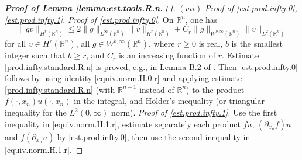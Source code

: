 \documentclass[10pt,reqno,a4paper]{article}
\numberwithin{equation}{section}
\theoremstyle{plain}
\theoremstyle{definition}
\newcommand{\R}{{\mathbb R}}
\newcommand{\pa}{\partial}
\begin{document}
\begin{proof}[\textbf{Proof of Lemma \ref{lemma:est.tools.R.n.+}}]
\medskip

$(vii)$ \emph{Proof of \eqref{est.prod.infty.0}, \eqref{est.prod.infty.1}}.
\emph{Proof of \eqref{est.prod.infty.0}}. On $\R^n$, one has 
\begin{equation} \label{prod.infty.standard.R.n}
\| g v \|_{H^r(\R^n)} \leq 2 \| g \|_{L^\infty(\R^n)} \| v \|_{H^r(\R^n)} 
+ C_r \| g \|_{W^{b,\infty}(\R^n)} \| v \|_{L^2(\R^n)}
\end{equation}
for all $v \in H^r(\R^n)$, all $g \in W^{b,\infty}(\R^n)$, 
where $r \geq 0$ is real, $b$ is the smallest integer such that $b \geq r$, 
and $C_r$ is an increasing function of $r$. 
Estimate \eqref{prod.infty.standard.R.n} is proved, e.g., in Lemma B.2 of \cite{Baldi.Haus.AIHP.2023}. 
Then \eqref{est.prod.infty.0} follows by using identity \eqref{equiv.norm.H.0.r} 
and applying estimate \eqref{prod.infty.standard.R.n} (with $\R^{n-1}$ instead of $\R^n$) 
to the product $f(\cdot, x_n) u(\cdot, x_n)$ in the integral, 
and H\"older's inequality (or triangular inequality for the $L^2(0,\infty)$ norm). 
\emph{Proof of \eqref{est.prod.infty.1}}. 
Use the first inequality in \eqref{equiv.norm.H.1.r}, 
estimate separately each product $fu$, $(\pa_{x_n} f) u$ and $f(\pa_{x_n} u)$ 
by \eqref{est.prod.infty.0}, then use the second inequality in \eqref{equiv.norm.H.1.r}. 

\medskip


\end{proof}
\end{document}
